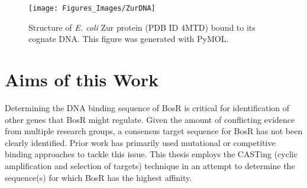 \documentclass[12pt,twoside]{reedthesis}
\begin{document}
		 		 	
		 		 			 			\begin{figure}[h!tbp]
		 		 			 				
		 		 			 				\centering
		 		 			 				\texttt{[image: Figures\_Images/ZurDNA]}
		 		 			 				\caption[Structure of \textit{E. coli} Zur Protein Bound to DNA]{Structure of \textit{E. coli} Zur protein (PDB ID 4MTD) bound to its cognate DNA. This figure was generated with PyMOL.}
		 		 			 				\label{ZurDNA}
		 		 			 			\end{figure}
		 		 			 			
		 		 			 			\clearpage
	
	
	
	
		 
		  
\section{Aims of this Work}

Determining the DNA binding sequence of BosR is critical for identification of other genes that BosR might regulate. Given the amount of conflicting evidence from multiple research groups, a consensus target sequence for BosR has not been clearly identified. Prior work has primarily used mutational or competitive binding approaches to tackle this issue. This thesis employs the CASTing (cyclic amplification and selection of targets) technique in an attempt to determine the sequence(s) for which BosR has the highest affinity. 
\end{document}

